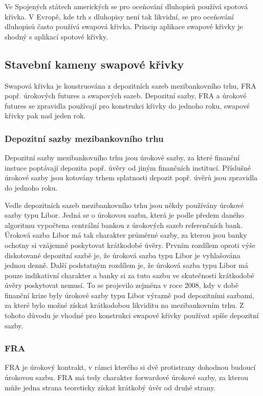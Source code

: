 \documentclass[a4paper]{book}
\begin{document}
Ve Spojených státech amerických se pro oceňování dluhopisů používá spotová křivka. V Evropě, kde trh s dluhopisy není tak likvidní, se pro oceňování dluhopisů často používá swapová křivka. Princip aplikace swapové křivky je shodný s aplikací spotové křivky.

\subsection{Stavební kameny swapové křivky}

Swapová křivka je konstruována z depozitních sazeb mezibankovního trhu, FRA popř. úrokových futures a swapových sazeb. Depozitní sazby, FRA a úrokové futures se zpravidla používají pro konstrukci křivky do jednoho roku, swapové křivky pak nad jeden rok.

\subsubsection{Depozitní sazby mezibankovního trhu}

Depozitní sazby mezibankovního trhu jsou úrokové sazby, za které finanční instuce poptávají depozita popř. úvěry od jiným finančních institucí. Příslušné úrokové sazby jsou kotovány trhem splatnosti depozit popř. úvěrů jsou zpravidla do jednoho roku.

Vedle depozitních sazeb mezibankovního trhu jsou někdy používány úrokové sazby typu Libor. Jedná se o úrokovou sazbu, která je podle předem daného algoritmu vypočtena centrální bankou z úrokových sazeb referenčních bank. Úroková sazba Libor má tak charakter průměrné sazby, za kterou jsou banky ochotny si vzájemně poskytovat krátkodobé úvěry. Prvním rozdílem oproti výše diskotované depozitní sazbě je, že úroková sazba typu Libor je vyhlašována jednou denně. Další podstatným rozdílem je, že úroková sazba typu Libor má pouze indikativní charakter a banky si za tuto sazbu ve skutečnosti krátkodobé úvěry poskytovat nemusí. To se projevilo zejména v roce 2008, kdy v době finanční krize byly úrokové sazby typu Libor výrazně pod depozitními sazbami, za které bylo možné získat krátkodobou likviditu na mezibankovním trhu. Z tohoto důvodu je vhodné pro konstrukci swapové křivky používat spíše depozitní sazby.

\subsubsection{FRA}

FRA je úrokový kontrakt, v rámci kterého si dvě protistrany dohodnou budoucí úrokovou sazbu. FRA má tedy charakter forwardové úrokové sazby, za kterou může jedna strana teoreticky získat krátkobý úvěr od druhé strany.
\end{document}
